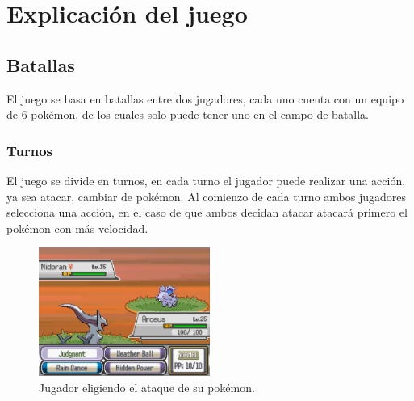 \chapter{Explicación del juego}

\section{Batallas}

El juego se basa en batallas entre dos jugadores, cada uno cuenta con un equipo de 6 pokémon, de los cuales solo puede tener uno en el campo de batalla. 
\subsection{Turnos}
El juego se divide en turnos, en cada turno el jugador puede realizar una acción, ya sea atacar, cambiar de pokémon. Al comienzo de cada turno ambos jugadores selecciona una acción, en el caso de que ambos decidan atacar atacará primero el pokémon con más velocidad. 

\begin{figure}[H]
        \centering
        \includegraphics[width=0.5\textwidth]{figures/combat.jpg}
        \caption{Jugador eligiendo el ataque de su pokémon.}
        \label{fig:turn}
\end{figure}
